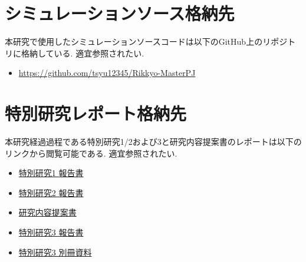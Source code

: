 \chapter{シミュレーションソース格納先}
本研究で使用したシミュレーションソースコードは以下のGitHub上のリポジトリに格納している. 適宜参照されたい.
\begin{itemize}
  \item \url{https://github.com/tsyu12345/Rikkyo-MasterPJ}
\end{itemize}

\chapter{特別研究レポート格納先}
本研究経過過程である特別研究1/2および3と研究内容提案書のレポートは以下のリンクから閲覧可能である. 適宜参照されたい.
\begin{itemize}
  \item \href{https://drive.google.com/open?id=1cAxzPoKxxjQKVu29GLQ0nsldmYBtgDEn&usp=drive_fs}{特別研究1 報告書}
  \item \href{https://drive.google.com/open?id=14rU8VHIF_2HHVoE2twPA_s9i6qF9QqlJ&usp=drive_fs}{特別研究2 報告書}
  \item \href{https://drive.google.com/open?id=1cJ8v32mS4TthynS6yP99nYb8Sv3YQPLZ&usp=drive_fs}{研究内容提案書}
  \item \href{https://drive.google.com/open?id=1cLeL2UJFi6_QtMtjGqVr22aTDtoGnCT5&usp=drive_fs}{特別研究3 報告書}
  \item \href{https://drive.google.com/open?id=14ub9oX1HVd4acJh_h1ov97LJCkNjIwnq&usp=drive_fs}{特別研究3 別冊資料}
\end{itemize}